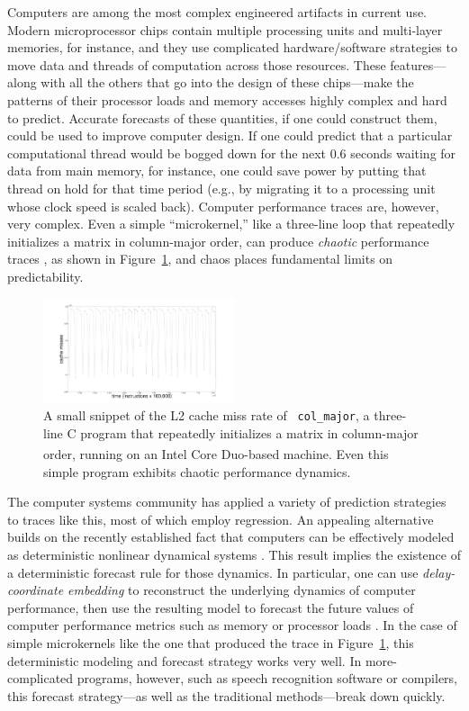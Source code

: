 \documentclass{article}
\begin{document}
Computers are among the most complex engineered artifacts in current
use.  Modern microprocessor chips contain multiple processing units
and multi-layer memories, for instance, and they use complicated
hardware/software strategies to move data and threads of computation
across those resources.  These features---along with all the others
that go into the design of these chips---make the patterns of their
processor loads and memory accesses highly complex and hard to
predict.  Accurate forecasts of these quantities, if one could
construct them, could be used to improve computer design.  If one
could predict that a particular computational thread would be bogged
down for the next 0.6 seconds waiting for data from main memory, for
instance, one could save power by putting that thread on hold for that
time period (e.g., by migrating it to a processing unit whose clock
speed is scaled back).  Computer performance traces are, however, very
complex.  Even a simple ``microkernel,'' like a three-line loop that
repeatedly initializes a matrix in column-major order, can produce
{\sl chaotic} performance traces \cite{mytkowicz09}, as shown in
Figure~\ref{fig:cache}, and chaos places fundamental limits on
predictability.
%
\begin{figure}[htbp]
   \centering
   \includegraphics[width=0.5\textwidth]{figs/colCacheShort}
   \caption{A small snippet of the L2 cache miss rate of {\tt
       col\_major}, a three-line C program that repeatedly initializes
     a matrix in column-major order, running on an Intel Core
     Duo\textsuperscript{\textregistered}-based machine.  Even this
     simple program exhibits chaotic performance dynamics.}
   \label{fig:cache}
 \end{figure}

The computer systems community has applied a variety of prediction
strategies to traces like this, most of which employ regression.  An
appealing alternative builds on the recently established fact that
computers can be effectively modeled as deterministic nonlinear
dynamical systems \cite{mytkowicz09}.  This result implies the
existence of a deterministic forecast rule for those dynamics.  In
particular, one can use \emph{delay-coordinate embedding} to
reconstruct the underlying dynamics of computer performance, then use
the resulting model to forecast the future values of computer
performance metrics such as memory or processor loads
\cite{josh-ida2011}.  In the case of simple microkernels like the one
that produced the trace in Figure~\ref{fig:cache}, this deterministic
modeling and forecast strategy works very well.  In more-complicated
programs, however, such as speech recognition software or compilers,
this forecast strategy---as well as the traditional methods---break
down quickly.
\end{document}
